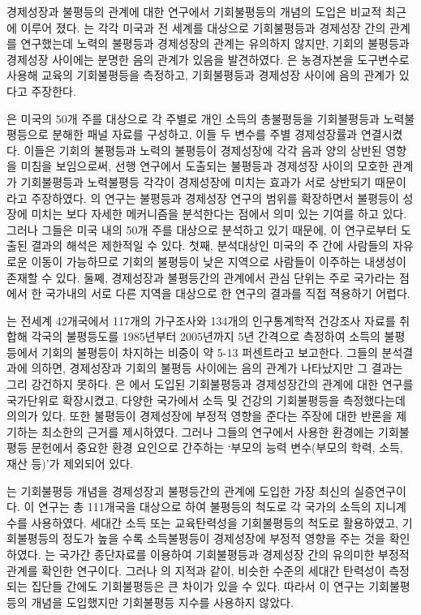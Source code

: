 경제성장과 불평등의 관계에 대한 연구에서 기회불평등의 개념의 도입은 비교적 최근에 이루어 졌다.
\citet{mnr13, mnr14}는 각각 미국과 전 세계를 대상으로 기회불평등과 경제성장 간의 관계를 연구했는데 노력의 불평등과 경제성장의 관계는 유의하지 않지만, 기회의 불평등과 경제성장 사이에는 분명한 음의 관계가 있음을 발견하였다.
\citet{metl13}은 농경자본을 도구변수로 사용해 교육의 기회불평등을 측정하고, 기회불평등과 경제성장 사이에 음의 관계가 있다고 주장한다.

\citet{mnr13}은 미국의 50개 주를 대상으로 각 주별로 개인 소득의 총불평등을 기회불평등과 노력불평등으로 분해한 패널 자료를 구성하고, 이들 두 변수를 주별 경제성장률과 연결시켰다.
이들은 기회의 불평등과 노력의 불평등이 경제성장에 각각 음과 양의 상반된 영향을 미침을 보임으로써, 선행 연구에서 도출되는 불평등과 경제성장 사이의 모호한 관계가 기회불평등과 노력불평등 각각이 경제성장에 미치는 효과가 서로 상반되기 때문이라고 주장하였다.
\citet{mnr13}의 연구는 불평등과 경제성장 연구의 범위를 확장하면서 불평등이 성장에 미치는 보다 자세한 메커니즘을 분석한다는 점에서 의미 있는 기여를 하고 있다.
그러나 그들은 미국 내의 50개 주를 대상으로 분석하고 있기 때문에, 이 연구로부터 도출된 결과의 해석은 제한적일 수 있다.
첫째, 분석대상인 미국의 주 간에 사람들의 자유로운 이동이 가능하므로 기회의 불평등이 낮은 지역으로 사람들이 이주하는 내생성이 존재할 수 있다.
둘쩨, 경제성장과 불평등간의 관계에서 관심 단위는 주로 국가라는 점에서 한 국가내의 서로 다른 지역을 대상으로 한 연구의 결과를 직접 젹용하기 어렵다.

 \citet{fetl18}는 전세계 42개국에서 117개의 가구조사와 134개의 인구통계학적 건강조사 자료를 취합해 각국의 불평등도를 1985년부터 2005년까지 5년 간격으로 측정하여 소득의 불평등에서 기회의 불평등이 차지하는 비중이 약 5-13 퍼센트라고 보고한다.
 그들의 분석결과에 의하면, 경제성장과 기회의 불평등 사이에는 음의 관계가 나타났지만 그 결과는 그리 강건하지 못하다.
\citet{fetl18}은 \citet{mnr13}에서 도입된 기회불평등과 경제성장간의 관계에 대한 연구를 국가단위로 확장시켰고, 다양한 국가에서 소득 및 건강의 기회불평등을 측정했다는데 의의가 있다.
 또한 불평등이 경제성장에 부정적 영향을 준다는 주장에 대한 반론을 제기하는 최소한의 근거를 제시하였다.
 그러나 그들의 연구에서 사용한 환경에는 기회불평등 문헌에서 중요한 환경 요인으로 간주하는 ‘부모의 능력 변수(부모의 학력, 소득, 재산 등)’가 제외되어 있다.
 
\citet{ane20}는 기회불평등 개념을 경제성장괴 불평등간의 관계에 도입한 가장 최신의 실증연구이다.
이 연구는 총 111개국을 대상으로 하여 불평등의 척도로 각 국가의 소득의 지니계수를 사용하였다.
세대간 소득 또는 교육탄력성을 기회불평등의 척도로 활용하였고, 기회불평등의 정도가 높을 수록 소득불평등이 경제성장에 부정적 영향을 주는 것을 확인하였다. 
\citet{ane20}는 국가간 종단자료를 이용하여 기회불평등과 경제성장 간의 유의미한 부정적 관계를 확인한 연구이다.
그러나 \citet{corak13}의 지적과 같이, 비슷한 수준의 세대간 탄력성이 측정되는 집단들 간에도 기회불평등은 큰 차이가 있을 수 있다.
따라서 이 연구는 기회불평등의 개념을 도입했지만 기회불평등 지수를 사용하지 않았다.


